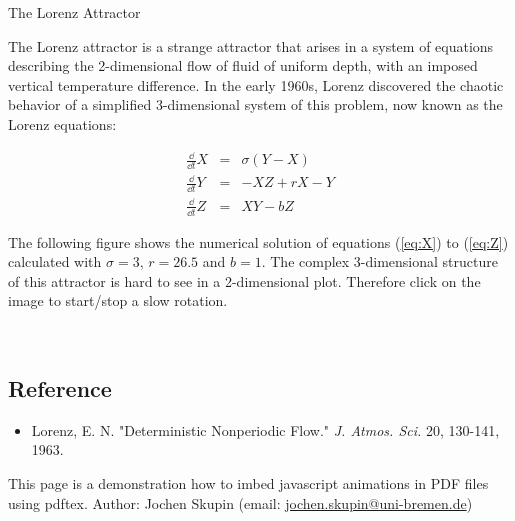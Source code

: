 \documentclass[12pt]{scrartcl}
\begin{document}
\begin{center}
{\sffamily\Huge The Lorenz Attractor}
\end{center}

\noindent
The Lorenz attractor is a strange attractor that arises in a system of
equations describing the \mbox{2-dimensional} flow of fluid of uniform depth, with
an imposed vertical temperature difference.
In the early 1960s, Lorenz discovered the chaotic behavior of a
simplified \mbox{3-dimensional} system of this problem,
now known as the Lorenz equations:

\begin{eqnarray}
  \frac{\dd}{\dd t}X &=& \sigma(Y-X) \label{eq:X}\\
  \frac{\dd}{\dd t}Y &=& -XZ + rX -Y \label{eq:Y}\\
  \frac{\dd}{\dd t}Z &=& XY - bZ \label{eq:Z}
\end{eqnarray}

\noindent 
The following figure shows the numerical solution of equations 
(\ref{eq:X}) to (\ref{eq:Z}) calculated with
$\sigma = 3$,
$r = 26.5$ and
$b = 1$.
The complex \mbox{3-dimensional} structure of this attractor is
hard to see in a \mbox{2-dimensional} plot. Therefore click on 
the image to start/stop a slow rotation.

\vfill


\begin{Form}
  \centering
  \\
\end{Form}

\subsection*{Reference}
\begin{itemize}
  \item Lorenz, E. N. "Deterministic Nonperiodic Flow." 
	{\em J. Atmos. Sci.} 20, 130-141, 1963.
\end{itemize}


\enlargethispage{5\baselineskip}
\vfill\noindent\tiny
This page is a demonstration how to imbed javascript animations 
in PDF files using pdftex.
\hfill Author: Jochen Skupin (email: \url{jochen.skupin@uni-bremen.de})
\end{document}
